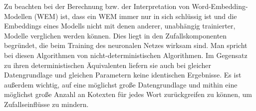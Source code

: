 \hspace{-1mm} Zu beachten bei der Berechnung bzw. der Interpretation von Word-Embedding-Modellen (WEM) ist, dass ein WEM immer nur in sich schlüssig ist und die Embeddings eines Modells nicht mit denen anderer, unabhängig trainierter, Modelle verglichen werden können. Dies liegt in den Zufallskomponenten begründet, die beim Training des neuronalen Netzes wirksam sind. Man spricht bei diesen Algorithmen von nicht-deterministischen Algorithmen. Im Gegensatz zu ihren deterministischen Äquivalenten liefern sie auch bei gleicher Datengrundlage und gleichen Parametern keine identischen Ergebnisse. Es ist außerdem wichtig, auf eine möglichst große Datengrundlage und mithin eine möglichst große Anzahl an Kotexten für jedes Wort zurückgreifen zu können, um Zufallseinflüsse zu mindern.


